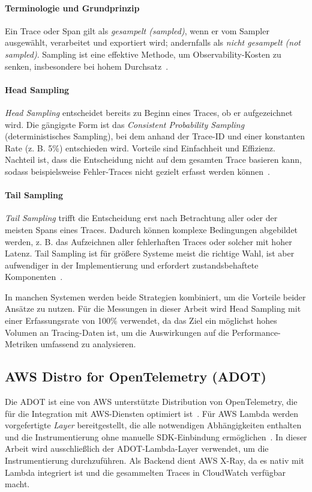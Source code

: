 \paragraph{Terminologie und Grundprinzip}
Ein Trace oder Span gilt als \emph{gesampelt (sampled)}, wenn er vom Sampler ausgewählt, verarbeitet und exportiert wird; andernfalls als \emph{nicht gesampelt (not sampled)}. Sampling ist eine effektive Methode, um Observability-Kosten zu senken, insbesondere bei hohem Durchsatz~\cite{OpenTelemetrySampling}. 

\paragraph{Head Sampling}
\emph{Head Sampling} entscheidet bereits zu Beginn eines Traces, ob er aufgezeichnet wird. Die gängigste Form ist das \emph{Consistent Probability Sampling} (deterministisches Sampling), bei dem anhand der Trace-ID und einer konstanten Rate (z. B. 5\%) entschieden wird. Vorteile sind Einfachheit und Effizienz. Nachteil ist, dass die Entscheidung nicht auf dem gesamten Trace basieren kann, sodass beispielsweise Fehler-Traces nicht gezielt erfasst werden können~\cite{OpenTelemetrySampling}.

\paragraph{Tail Sampling}
\emph{Tail Sampling} trifft die Entscheidung erst nach Betrachtung aller oder der meisten Spans eines Traces. Dadurch können komplexe Bedingungen abgebildet werden, z. B. das Aufzeichnen aller fehlerhaften Traces oder solcher mit hoher Latenz. Tail Sampling ist für größere Systeme meist die richtige Wahl, ist aber aufwendiger in der Implementierung und erfordert zustandsbehaftete Komponenten~\cite{OpenTelemetrySampling}.

In manchen Systemen werden beide Strategien kombiniert, um die Vorteile beider Ansätze zu nutzen. 
Für die Messungen in dieser Arbeit wird Head Sampling mit einer Erfassungsrate von 100\% verwendet, da das Ziel ein möglichst hohes 
Volumen an Tracing-Daten ist, um die Auswirkungen auf die Performance-Metriken umfassend zu analysieren.

\subsection{AWS Distro for OpenTelemetry (ADOT)}
\label{sec:adot}
Die \ac{ADOT} ist eine von AWS unterstützte Distribution von OpenTelemetry, die für die Integration mit AWS-Diensten 
optimiert ist~\cite{ADOT}. Für AWS Lambda werden vorgefertigte \textit{Layer} bereitgestellt, die alle notwendigen 
Abhängigkeiten enthalten und die Instrumentierung ohne manuelle SDK-Einbindung ermöglichen~\cite{ADOT_Lambda}.  
In dieser Arbeit wird ausschließlich der ADOT-Lambda-Layer verwendet, um die Instrumentierung durchzuführen. 
Als Backend dient AWS X-Ray, da es nativ mit Lambda integriert ist und die gesammelten Traces in CloudWatch verfügbar macht.


